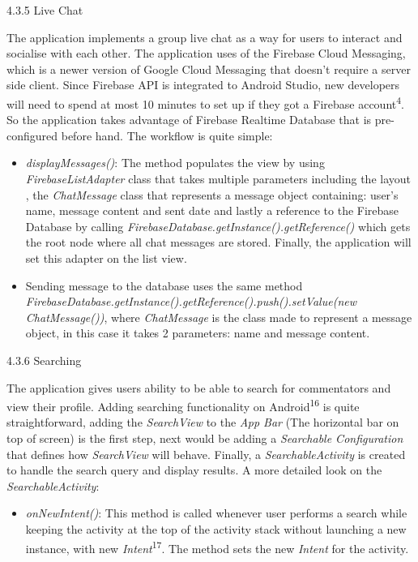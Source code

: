 \documentclass{article}
\begin{document}
\begin{flushleft}
{\large 4.3.5 Live Chat}\par
The application implements a group live chat as a way for users to interact and socialise with each other. The application uses of the Firebase Cloud Messaging, which is a newer version of Google Cloud Messaging that doesn't require a server side client. Since Firebase API is integrated to Android Studio, new developers will need to spend at most 10 minutes to set up if they got a Firebase account\textsuperscript{4}. So the application takes advantage of Firebase Realtime Database that is pre-configured before hand. The workflow is quite simple:\par
\begin{itemize}
	\item \textit{displayMessages()}: The method populates the view by using \textit{FirebaseListAdapter} class that takes multiple parameters including the layout , the \textit{ChatMessage} class that represents a message object containing: user's name, message content and sent date and lastly a reference to the Firebase Database by calling \textit{FirebaseDatabase.getInstance().getReference()} which gets the root node where all chat messages are stored. Finally, the application will set this adapter on the list view.
	\item Sending message to the database uses the same method \textit{FirebaseDatabase.getInstance().getReference().push().setValue(new ChatMessage())}, where \textit{ChatMessage} is the class made to represent a message object, in this case it takes 2 parameters: name and message content.\\
\end{itemize}
{\large 4.3.6 Searching}\par
The application gives users ability to be able to search for commentators and view their profile. Adding searching functionality on Android\textsuperscript{16} is quite straightforward, adding the \textit{SearchView} to the \textit{App Bar} (The horizontal bar on top of screen) is the first step, next would be adding a \textit{Searchable Configuration} that defines how \textit{SearchView} will behave. Finally, a \textit{SearchableActivity} is created to handle the search query and display results. A more detailed look on the \textit{SearchableActivity}:
\begin{itemize}
	\item \textit{onNewIntent()}: This method is called whenever user performs a search while keeping the activity at the top of the activity stack without launching a new instance, with new \textit{Intent}\textsuperscript{17}. The method sets the new \textit{Intent} for the activity.

\end{itemize}
\end{flushleft}
\end{document}
